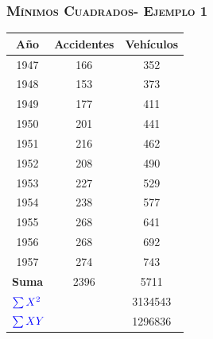 \documentclass[16.5pt]{beamer}
\begin{document}
{
\begin{frame}
\frametitle{\textsc{Mínimos Cuadrados- Ejemplo 1}}
\hspace*{-5mm}
\vspace*{-5mm} 


\begin{center}
\begin{tabular}{| c |c |c|}
\hline%
  \textbf{Año} & \textbf{Accidentes} & \textbf{Vehículos} 
 \tabularnewline
\hline
1947 & 166 &  352 \\
1948 & 153 & 373 \\
1949 & 177 & 411 \\
1950 & 201 & 441 \\
1951 & 216 & 462 \\
1952 & 208 & 490 \\
1953 & 227 & 529 \\
1954 & 238 & 577 \\
1955 & 268 & 641 \\
1956 & 268 & 692 \\
1957 & 274 & 743 \\
\hline
\textbf{Suma} & 2396 & 5711 \\
\hline
 \multicolumn{2}{|l|}{$\color{blue}\sum X^2$}  & 3134543\\
\hline
\multicolumn{2}{|l|}{$\color{blue}\sum XY$}  & 1296836  \\
\hline
\end{tabular}
\end{center}
\end{frame}
}
\end{document}
